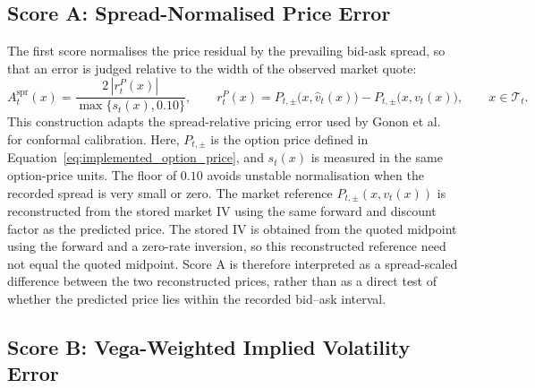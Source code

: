 \subsection{Score A: Spread-Normalised Price Error}
\label{subsec:score_a}

The first score normalises the price residual by the prevailing bid-ask spread, so that an error is judged relative to the width of the observed market quote:
\begin{equation}
    A^{\text{spr}}_t(x)
    = \frac{2\,|r^P_t(x)|}{\max\{s_t(x),0.10\}},
    \qquad
    r^P_t(x)
    = P_{t,\pm}\big(x,\hat{v}_t(x)\big)
    - P_{t,\pm}\big(x,v_t(x)\big),
    \qquad x\in\mathcal{T}_t.
    \label{eq:score_a}
\end{equation}
This construction adapts the spread-relative pricing error used by Gonon et al.\ \cite{gonon2024operator} for conformal calibration. Here, $P_{t,\pm}$ is the option price defined in Equation~\ref{eq:implemented_option_price}, and $s_t(x)$ is measured in the same option-price units. The floor of $0.10$ avoids unstable normalisation when the recorded spread is very small or zero. The market reference $P_{t,\pm}(x,v_t(x))$ is reconstructed from the stored market IV using the same forward and discount factor as the predicted price. The stored IV is obtained from the quoted midpoint using the forward and a zero-rate inversion, so this reconstructed reference need not equal the quoted midpoint. Score A is therefore interpreted as a spread-scaled difference between the two reconstructed prices, rather than as a direct test of whether the predicted price lies within the recorded bid--ask interval.

\subsection{Score B: Vega-Weighted Implied Volatility Error}
\label{subsec:score_b}

